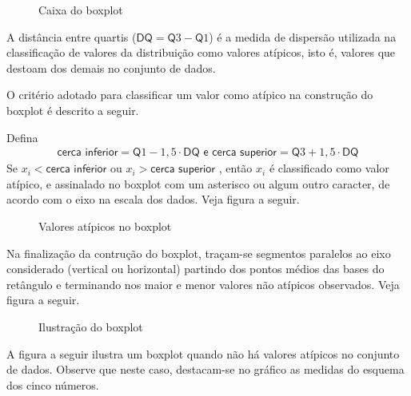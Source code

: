 \begin{figure}[H]
\centering
\capstart

\noindent{}
\caption{Caixa do boxplot}\label{\detokenize{PE104-6:fig-caixadoboxplot}}\label{\detokenize{PE104-6:id4}}\end{figure}

A distância entre quartis (\(\textsf{DQ}=\textsf{Q}3-\textsf{Q}1\)) é a medida de dispersão utilizada na classificação de valores da distribuição como  valores atípicos, isto é, valores que destoam dos demais no conjunto de dados.

O critério adotado para classificar um valor como atípico na construção do boxplot é descrito a seguir.

Defina
\begin{equation*}
\begin{split}\textsf{cerca inferior}=\textsf{Q}1-1,5\cdot \textsf{DQ}\textsf{ e }\textsf{cerca superior}=\textsf{Q}3+1,5\cdot \textsf{DQ}\end{split}
\end{equation*}
Se \(x_i< \textsf{cerca inferior}\) ou \(x_i> \textsf{cerca superior}\) , então \(x_i\) é classificado como valor atípico, e assinalado no boxplot com um asterisco ou algum outro caracter, de acordo com o eixo na escala dos dados. Veja figura a seguir.

\begin{figure}[H]
\centering
\capstart

\noindent{}
\caption{Valores atípicos no boxplot}\label{\detokenize{PE104-6:fig-valoresatipicosnoboxplot}}\label{\detokenize{PE104-6:id5}}\end{figure}

Na finalização da contrução do boxplot, traçam-se segmentos paralelos ao eixo considerado (vertical ou horizontal) partindo dos pontos médios das bases do retângulo e terminando nos maior e menor valores não atípicos observados. Veja figura a seguir.

\begin{figure}[H]
\centering
\capstart

\noindent{}
\caption{Ilustração do boxplot}\label{\detokenize{PE104-6:fig-finalizacaodoboxplot}}\label{\detokenize{PE104-6:id6}}\end{figure}

A figura a seguir ilustra um boxplot quando não há valores atípicos no conjunto de dados. Observe que neste caso, destacam-se no gráfico as medidas do esquema dos cinco números.

